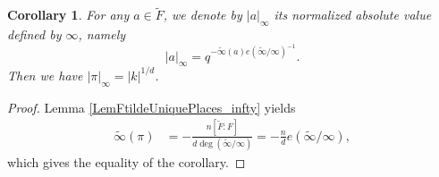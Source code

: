 \documentclass[10pt]{amsart}
\theoremstyle{plain}
\newtheorem{cor}[thm]{Corollary}
\theoremstyle{definition}
\newcommand{\End}{\mathrm{End}}
\begin{document}

\begin{cor}\label{CorReplaceRH}
	For any $a\in \tilde{F}$, we denote by $|a|_\infty$ its normalized absolute value defined by $\infty$,
	namely 
	\[
	|a|_\infty=q^{-\tilde{\infty}(a)e(\tilde{\infty}/\infty)^{-1}}.
	\]
	Then we have $|\pi|_\infty=|k|^{1/d}$.
\end{cor}
\begin{proof}
	Lemma \ref{LemFtildeUniquePlaces_infty} yields
	\[
	\begin{aligned}
		\tilde{\infty}(\pi)&=-\frac{n[\tilde{F}:F]}{d\deg(\tilde{\infty}/\infty)}=-\frac{n}{d}e(\tilde{\infty}/\infty),
	\end{aligned}
	\]
	which gives the equality of the corollary.
\end{proof}
\end{document}
